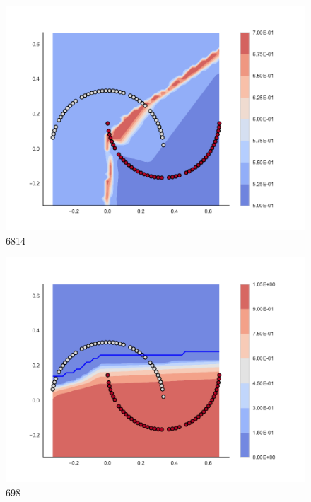 \begin{subfigure}[b]{0.09\textwidth}
    \includegraphics[width=\textwidth]{img/convergence/6814.pdf}
    \caption{6814}
    \label{fig:convergence_6814}
\end{subfigure}
%
\begin{subfigure}[b]{0.09\textwidth}
    \includegraphics[width=\textwidth]{img/convergence/698.pdf}
    \caption{698}
    \label{fig:convergence_698}
\end{subfigure}
%
